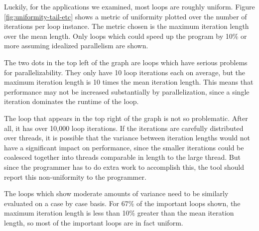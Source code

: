 \documentclass[12pt,twoside]{reedthesis}
\begin{document}
		Luckily, for the applications we examined, most loops are roughly uniform. Figure \ref{fig:uniformity-tail-etc} shows a metric of uniformity plotted over the number of iterations per loop instance. The metric chosen is the maximum iteration length over the mean length. Only loops which could speed up the program by 10\% or more assuming idealized parallelism are shown. 
		
		The two dots in the top left of the graph are loops which have serious problems for parallelizability. They only have 10 loop iterations each on average, but the maximum iteration length is 10 times the mean iteration length. This means that performance may not be increased substantially by parallelization, since a single iteration dominates the runtime of the loop. 
		
		The loop that appears in the top right of the graph is not so problematic. After all, it has over 10,000 loop iterations. If the iterations are carefully distributed over threads, it is possible that the variance between iteration lengths would not have a significant impact on performance, since the smaller iterations could be coalesced together into threads comparable in length to the large thread. But since the programmer has to do extra work to accomplish this, the tool should report this non-uniformity to the programmer.
		
		The loops which show moderate amounts of variance need to be similarly evaluated on a case by case basis. For 67\% of the important loops shown, the maximum iteration length is less than 10\% greater than the mean iteration length, so most of the important loops are in fact uniform. 
		
		
		
\end{document}
